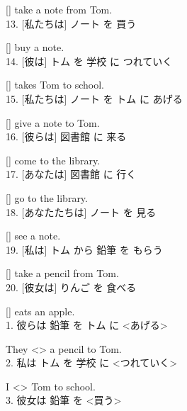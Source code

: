 \documentclass[uplatex,
paper=a4,
fontsize=18pt,
jafontsize=16pt,
number_of_lines=30,
line_length=30zh,
baselineskip=25pt,
]{jlreq}
\begin{document}
  [\hspace{3em}] take a note from Tom.
\\

13.  [私たちは] ノート を 買う

  [\hspace{3em}] buy a note.
\\

14.  [彼は] トム を 学校 に つれていく

  [\hspace{3em}] takes Tom to school.
\\

15.  [私たちは] ノート を トム に あげる

  [\hspace{3em}] give a note to Tom.
\\

16.  [彼らは] 図書館 に 来る

  [\hspace{3em}] come to the library.
\\

17.  [あなたは] 図書館 に 行く

  [\hspace{3em}] go to the library.
\\

18.  [あなたたちは] ノート を 見る

  [\hspace{3em}] see a note.
\\

19.  [私は] トム から 鉛筆 を もらう

  [\hspace{3em}] take a pencil from Tom.
\\

20.  [彼女は] りんご を 食べる

  [\hspace{3em}] eats an apple.
\\


\newpage
{}
1.  彼らは 鉛筆 を トム に <あげる>

  They <\hspace{3em}> a pencil to Tom.
\\

2.  私は トム を 学校 に <つれていく>

  I <\hspace{3em}> Tom to school.
\\

3.  彼女は 鉛筆 を <買う>
\end{document}
